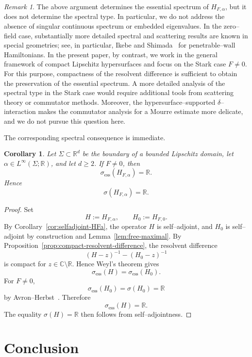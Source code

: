 \documentclass[a4paper,11pt]{article}
\numberwithin{equation}{section}
\newtheorem{cor}[lem]{Corollary}
\theoremstyle{remark}
\newtheorem{rem}[lem]{Remark}
\theoremstyle{definition}
\theoremstyle{remark}
\begin{document}
\begin{rem}
The above argument determines the essential spectrum of $H_{F,\alpha}$, but it does not determine the spectral type.
In particular, we do not address the absence of singular continuous spectrum or embedded eigenvalues.
In the zero--field case, substantially more detailed spectral and scattering results are known in special geometries; see, in particular, Ikebe and Shimada~\cite{IkebeShimada1991} for penetrable--wall Hamiltonians.
In the present paper, by contrast, we work in the general framework of compact Lipschitz hypersurfaces and focus on the Stark case $F\ne0$.
For this purpose, compactness of the resolvent difference is sufficient to obtain the preservation of the essential spectrum.
A more detailed analysis of the spectral type in the Stark case would require additional tools from scattering theory or commutator methods.
Moreover, the hypersurface--supported $\delta$--interaction makes the commutator analysis for a Mourre estimate more delicate, and we do not pursue this question here.
\end{rem}

The corresponding spectral consequence is immediate.

\begin{cor}\label{cor:essential-spectrum}
Let $\Sigma\subset\mathbb R^d$ be the boundary of a bounded Lipschitz domain, let $\alpha\in L^\infty(\Sigma;\mathbb R)$, and let $d\ge2$.
If $F\ne0$, then
$$
\sigma_{\mathrm{ess}}(H_{F,\alpha})=\mathbb R.
$$
Hence
$$
\sigma(H_{F,\alpha})=\mathbb R.
$$
\end{cor}

\begin{proof}
Set
$$
H:=H_{F,\alpha},\qquad H_0:=H_{F,0}.
$$
By Corollary~\ref{cor:selfadjoint-HFa}, the operator $H$ is self--adjoint, and $H_0$ is self--adjoint by construction and Lemma~\ref{lem:free-maximal}.
By Proposition~\ref{prop:compact-resolvent-difference}, the resolvent difference
$$
(H-z)^{-1}-(H_0-z)^{-1}
$$
is compact for $z\in\mathbb C\setminus\mathbb R$.
Hence Weyl's theorem gives
$$
\sigma_{\mathrm{ess}}(H)=\sigma_{\mathrm{ess}}(H_0).
$$
For $F\ne0$,
$$
\sigma_{\mathrm{ess}}(H_0)=\sigma(H_0)=\mathbb R
$$
by Avron--Herbst~\cite{AvronHerbst1977}.
Therefore
$$
\sigma_{\mathrm{ess}}(H)=\mathbb R.
$$
The equality $\sigma(H)=\mathbb R$ then follows from self--adjointness.
\end{proof}

\section{Conclusion}
\end{document}
